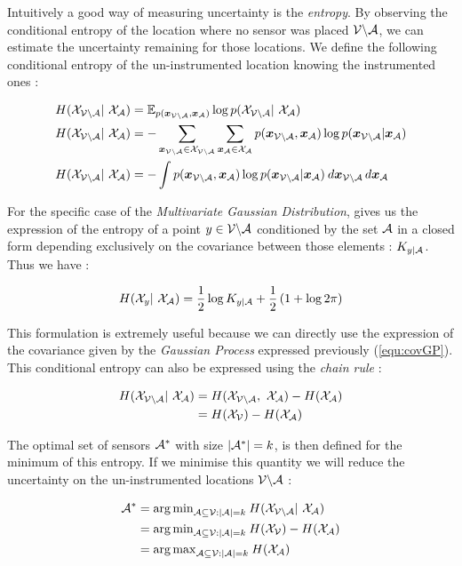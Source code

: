 \documentclass[12pt,twoside]{report}
\begin{document}
Intuitively a good way of measuring uncertainty is the \textit{entropy}. By observing the conditional entropy of the location where no sensor was placed $\mathcal{V} \backslash\mathcal{A}$, we can estimate the uncertainty remaining for those locations. We define the following conditional entropy of the un-instrumented location knowing the instrumented ones \citep[p.~16]{cover_elements_1991} :

\begin{align}
	H(\X_{\VA} | \X_\A) &= \mathbb{E}_{p(\vec{x}_{\VA},\vec{x}_\A)} \log p(\X_{\VA} | \X_\A) \\
	H(\X_{\VA} | \X_\A) &= - \sum_{\vec{x}_{\VA} \in \X_{\VA}}\sum_{\vec{x}_{\A} \in \X_{\A}} p(\vec{x}_{\VA},\vec{x}_\A) \log p(\vec{x}_{\VA}|\vec{x}_\A) \\
	H(\X_{\VA} | \X_\A) &= - \int p(\vec{x}_{\VA},\vec{x}_\A) \log p(\vec{x}_{\VA}|\vec{x}_\A) \: d\vec{x}_{\VA} \, d\vec{x}_\A 
\end{align}

For the specific case of the \textit{Multivariate Gaussian Distribution}, \citet{krause_near-optimal_2008} gives us the expression of the entropy of a point $y \in \mathcal{V} \backslash\mathcal{A}$ conditioned by the set $\mathcal{A}$ in a closed form depending exclusively on the covariance between those elements : $K_{y | \mathcal{A}}$. Thus we have :  

\begin{equation}
	H(\X_{y} | \X_\A) = \frac{1}{2} \log K_{y | \A} + \frac{1}{2} \left(1 + \log 2\pi  \right) \label{equ:entGP}
\end{equation}

This formulation is extremely useful because we can directly use the expression of the covariance given by the \textit{Gaussian Process} expressed previously (\ref{equ:covGP}). \\


This conditional entropy can also be expressed using the \textit{chain rule}  \citep[p.~16]{cover_elements_1991} : 

\begin{align}
	H(\X_{\VA} | \X_\A) &= H(\X_{\VA} ,  \X_\A) -  H(\X_{\A}) \\
	&= H(\X_{\V}) -  H(\X_{\A}) 
\label{equ:chainentropy}
\end{align}

The optimal set of sensors $\mathcal{A}^*$ with size $|\mathcal{A}^*| = k$, is then defined for the minimum of this entropy. If we minimise this quantity we will reduce the uncertainty on the un-instrumented locations $\mathcal{V} \backslash\mathcal{A}$ : 

\begin{align}
	\A^* &= {\arg\min}_{\A \subseteq \V : |\A| = k } \: H(\X_{\VA} | \X_\A) \\
	 &= {\arg\min}_{\A \subseteq \V : |\A| = k }\:  H(\X_\V) -  H(\X_{\A}) \\
	 &= {\arg\max}_{\A \subseteq \V : |\A| = k }\:  H(\X_{\A}) 
\end{align}
\end{document}
